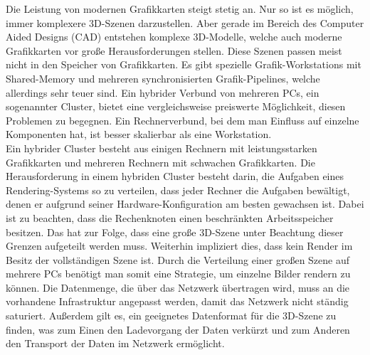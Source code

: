 Die Leistung von modernen Grafikkarten steigt stetig an. Nur so ist es möglich, immer komplexere 3D-Szenen darzustellen. Aber gerade im Bereich des Computer Aided Designs (CAD) entstehen komplexe 3D-Modelle, welche auch moderne Grafikkarten vor große Herausforderungen stellen. Diese Szenen passen meist nicht in den Speicher von Grafikkarten. Es gibt spezielle Grafik-Workstations mit Shared-Memory und mehreren synchronisierten Grafik-Pipelines, welche allerdings sehr teuer sind. Ein hybrider Verbund von mehreren PCs, ein sogenannter Cluster, bietet eine vergleichsweise preiswerte Möglichkeit, diesen Problemen zu begegnen. Ein Rechnerverbund, bei dem man Einfluss auf einzelne Komponenten hat, ist besser skalierbar als eine Workstation.\\
Ein hybrider Cluster besteht aus einigen Rechnern mit leistungsstarken Grafikkarten und mehreren Rechnern mit schwachen Grafikkarten. Die Herausforderung in einem hybriden Cluster besteht darin, die Aufgaben eines Rendering-Systems so zu verteilen, dass jeder Rechner die Aufgaben bewältigt, denen er aufgrund seiner Hardware-Konfiguration am besten gewachsen ist. Dabei ist zu beachten, dass die Rechenknoten einen beschränkten Arbeitsspeicher besitzen. Das hat zur Folge, dass eine große 3D-Szene unter Beachtung dieser Grenzen aufgeteilt werden muss. Weiterhin impliziert dies, dass kein Render im Besitz der vollständigen Szene ist. Durch die Verteilung einer großen Szene auf mehrere PCs benötigt man somit eine Strategie, um einzelne Bilder rendern zu können. Die Datenmenge, die über das Netzwerk übertragen wird, muss an die vorhandene Infrastruktur angepasst werden, damit das Netzwerk nicht ständig saturiert. Außerdem gilt es, ein geeignetes Datenformat für die 3D-Szene zu finden, was zum Einen den Ladevorgang der Daten verkürzt und zum Anderen den Transport der Daten im Netzwerk ermöglicht.

